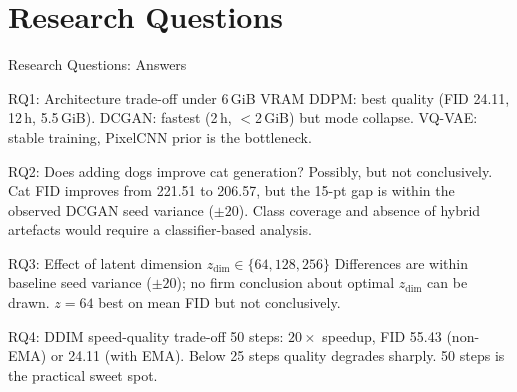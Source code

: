 \documentclass[aspectratio=169,10pt]{beamer}
\begin{document}
\section{Research Questions}
%
\begin{frame}[shrink=5]{Research Questions: Answers}
\footnotesize
  \begin{block}{RQ1: Architecture trade-off under 6\,GiB VRAM}
    DDPM: best quality (FID 24.11, 12\,h, 5.5\,GiB).
    DCGAN: fastest (2\,h, $<$2\,GiB) but mode collapse.
    VQ-VAE: stable training, PixelCNN prior is the bottleneck.
  \end{block}
  \vspace{3pt}
  \begin{block}{RQ2: Does adding dogs improve cat generation?}
    Possibly, but not conclusively. Cat FID improves from 221.51 to 206.57, but the
    15-pt gap is within the observed DCGAN seed variance ($\pm20$). Class coverage
    and absence of hybrid artefacts would require a classifier-based analysis.
  \end{block}
  \vspace{3pt}
  \begin{block}{RQ3: Effect of latent dimension $z_\text{dim} \in \{64,128,256\}$}
    Differences are within baseline seed variance ($\pm20$); no firm conclusion about
    optimal $z_\text{dim}$ can be drawn. $z=64$ best on mean FID but not conclusively.
  \end{block}
  \vspace{3pt}
  \begin{block}{RQ4: DDIM speed-quality trade-off}
    50 steps: $20\times$ speedup, FID 55.43 (non-EMA) or 24.11 (with EMA).
    Below 25 steps quality degrades sharply. 50 steps is the practical sweet spot.
  \end{block}
\end{frame}

%
\end{document}
